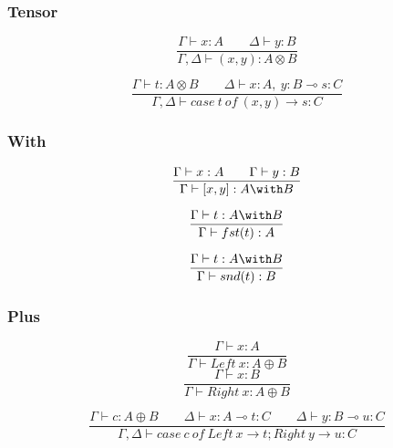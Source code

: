 \documentclass{beamer}
\begin{document}
\begin{frame}
  \frametitle{Tensor}
  \begin{equation}
    \frac{\Gamma \vdash x : A \qquad \Delta \vdash y : B}
         {\Gamma, \Delta \vdash (x, y) : A \otimes B}
  \end{equation}

  \pause%

  \begin{equation}
    \frac{\Gamma \vdash t : A \otimes B \qquad \Delta \vdash x : A,\ y : B \multimap s : C}
         {\Gamma, \Delta \vdash case\ t\ of\ (x, y) \rightarrow s : C}
  \end{equation}
\end{frame}

\begin{frame}
  \frametitle{With}
  \begin{equation}
    \frac{\Gamma \vdash x : A \qquad \Gamma \vdash y : B}
         {\Gamma \vdash [x,y] : A \with B}
  \end{equation}

  \pause%

  \begin{equation}
    \frac{\Gamma \vdash t : A \with B}
         {\Gamma \vdash fst(t) : A}
  \end{equation}

  \begin{equation}
    \frac{\Gamma \vdash t : A \with B}
         {\Gamma \vdash snd(t) : B}
  \end{equation}
\end{frame}

\begin{frame}
  \frametitle{Plus}
  \begin{equation}
    \frac{\Gamma \vdash x : A}
         {\Gamma \vdash Left\ x : A \oplus B}
  \end{equation}
  \begin{equation}
    \frac{\Gamma \vdash x : B}
         {\Gamma \vdash Right\ x : A \oplus B}
  \end{equation}

  \pause%

  \begin{equation}
    \frac{\Gamma \vdash c : A \oplus B \qquad \Delta \vdash x : A \multimap t : C \qquad \Delta \vdash y : B \multimap u : C}
         {\Gamma, \Delta \vdash case\ c\ of\ Left\ x \rightarrow t; Right\ y \rightarrow u : C}
  \end{equation}
\end{frame}
\end{document}

